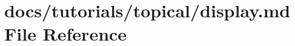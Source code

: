 \hypertarget{display_8md}{}\section{docs/tutorials/topical/display.md File Reference}
\label{display_8md}
